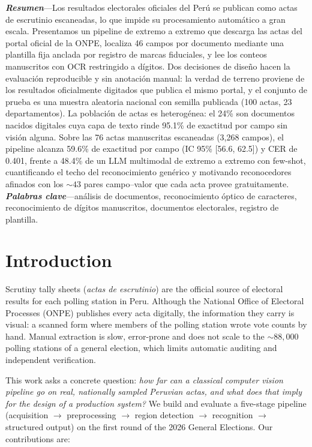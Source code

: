 \documentclass[conference]{IEEEtran}
\begin{document}
\noindent\textbf{\textit{Resumen}}---Los resultados electorales oficiales del
Per\'u se publican como actas de escrutinio escaneadas, lo que impide su
procesamiento autom\'atico a gran escala. Presentamos un pipeline de extremo a
extremo que descarga las actas del portal oficial de la ONPE, localiza 46
campos por documento mediante una plantilla fija anclada por registro de
marcas fiduciales, y lee los conteos manuscritos con OCR restringido a
d\'igitos. Dos decisiones de dise\~no hacen la evaluaci\'on reproducible y sin
anotaci\'on manual: la verdad de terreno proviene de los resultados
oficialmente digitados que publica el mismo portal, y el conjunto de prueba es
una muestra aleatoria nacional con semilla publicada (100 actas, 23
departamentos). La poblaci\'on de actas es heterog\'enea: el 24\% son
documentos nacidos digitales cuya capa de texto rinde 95.1\% de exactitud por
campo sin visi\'on alguna. Sobre las 76 actas manuscritas escaneadas (3,268
campos), el pipeline alcanza 59.6\% de exactitud por campo (IC 95\% [56.6,
62.5]) y CER de 0.401, frente a 48.4\% de un LLM multimodal de extremo a
extremo con few-shot, cuantificando el techo del reconocimiento gen\'erico y
motivando reconocedores afinados con los ${\sim}43$ pares campo--valor que
cada acta provee gratuitamente.\\[4pt]
\noindent\textbf{\textit{Palabras clave}}---an\'alisis de documentos,
reconocimiento \'optico de caracteres, reconocimiento de d\'igitos
manuscritos, documentos electorales, registro de plantilla.

\section{Introduction}
Scrutiny tally sheets (\emph{actas de escrutinio}) are the official source of
electoral results for each polling station in Peru. Although the National
Office of Electoral Processes (ONPE) publishes every acta digitally, the
information they carry is visual: a scanned form where members of the polling
station wrote vote counts by hand. Manual extraction is slow, error-prone and
does not scale to the ${\sim}88{,}000$ polling stations of a general election,
which limits automatic auditing and independent verification.

This work asks a concrete question: \emph{how far can a classical computer
vision pipeline go on real, nationally sampled Peruvian actas, and what does
that imply for the design of a production system?} We build and evaluate a
five-stage pipeline (acquisition $\rightarrow$ preprocessing $\rightarrow$
region detection $\rightarrow$ recognition $\rightarrow$ structured output)
on the first round of the 2026 General Elections. Our contributions are:
\end{document}
